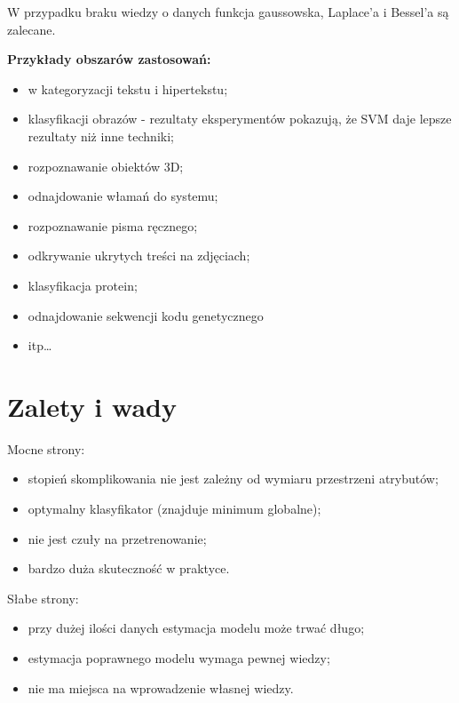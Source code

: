 \documentclass[
]{book}
\providecommand{\tightlist}{%
  \setlength{\itemsep}{0pt}\setlength{\parskip}{0pt}}
\theoremstyle{plain}
\theoremstyle{definition}
\theoremstyle{definition}
\theoremstyle{definition}
\theoremstyle{definition}
\theoremstyle{definition}
\theoremstyle{remark}
\begin{document}
W przypadku braku wiedzy o danych funkcja gaussowska, Laplace'a i Bessel'a są zalecane.

\textbf{Przykłady obszarów zastosowań:}

\begin{itemize}
\tightlist
\item
  w kategoryzacji tekstu i hipertekstu;
\item
  klasyfikacji obrazów - rezultaty eksperymentów pokazują, że SVM daje lepsze rezultaty niż inne techniki;
\item
  rozpoznawanie obiektów 3D;
\item
  odnajdowanie włamań do systemu;
\item
  rozpoznawanie pisma ręcznego;
\item
  odkrywanie ukrytych treści na zdjęciach;
\item
  klasyfikacja protein;
\item
  odnajdowanie sekwencji kodu genetycznego
\item
  itp\ldots{}
\end{itemize}

\section{Zalety i wady}\label{zalety-i-wady-2}

Mocne strony:

\begin{itemize}
\tightlist
\item
  stopień skomplikowania nie jest zależny od wymiaru przestrzeni atrybutów;
\item
  optymalny klasyfikator (znajduje minimum globalne);
\item
  nie jest czuły na przetrenowanie;
\item
  bardzo duża skuteczność w praktyce.
\end{itemize}

Słabe strony:

\begin{itemize}
\tightlist
\item
  przy dużej ilości danych estymacja modelu może trwać długo;
\item
  estymacja poprawnego modelu wymaga pewnej wiedzy;
\item
  nie ma miejsca na wprowadzenie własnej wiedzy.
\end{itemize}
\end{document}
